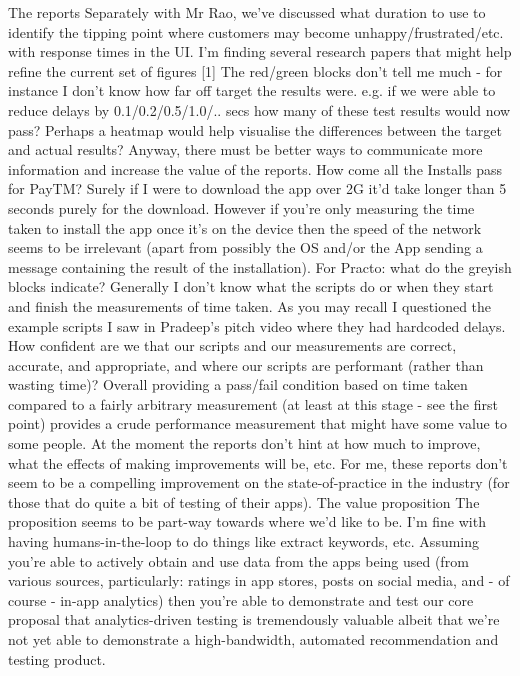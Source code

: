 The reports
Separately with Mr Rao, we've discussed what duration to use to identify the tipping point where customers may become unhappy/frustrated/etc. with response times in the UI. I'm finding several research papers that might help refine the current set of figures [1]
The red/green blocks don't tell me much - for instance I don't know how far off target the results were. e.g. if we were able to reduce delays by 0.1/0.2/0.5/1.0/.. secs how many of these test results would now pass? Perhaps a heatmap would help visualise the differences between the target and actual results? Anyway, there must be better ways to communicate more information and increase the value of the reports.
How come all the Installs pass for PayTM? Surely if I were to download the app over 2G it'd take longer than 5 seconds purely for the download. However if you're only measuring the time taken to install the app once it's on the device then the speed of the network seems to be irrelevant (apart from possibly the OS and/or the App sending a message containing the result of the installation).
 For Practo: what do the greyish blocks indicate?
Generally I don't know what the scripts do or when they start and finish the measurements of time taken. As you may recall I questioned the example scripts I saw in Pradeep's pitch video where they had hardcoded delays. How confident are we that our scripts and our measurements are correct, accurate, and appropriate, and where our scripts are performant (rather than wasting time)?
Overall providing a pass/fail condition based on time taken compared to a fairly arbitrary measurement (at least at this stage - see the first point) provides a crude performance measurement that might have some value to some people. At the moment the reports don't hint at how much to improve, what the effects of making improvements will be, etc. For me, these reports don't seem to be a compelling improvement on the state-of-practice in the industry (for those that do quite a bit of testing of their apps).
The value proposition
The proposition seems to be part-way towards where we'd like to be. I'm fine with having humans-in-the-loop to do things like extract keywords, etc. Assuming you're able to actively obtain and use data from the apps being used (from various sources, particularly: ratings in app stores, posts on social media, and - of course - in-app analytics) then you're able to demonstrate and test our core proposal that analytics-driven testing is tremendously valuable albeit that we're not yet able to demonstrate a high-bandwidth, automated recommendation and testing product.

